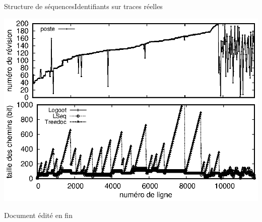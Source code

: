 \begin{frame}{Structure de séquences}{Identifiants sur traces réelles}

  \hspace{-1cm}
  \begin{minipage}{0.45\textwidth}
    \includegraphics[width=1.29\textwidth]{img/replication/poste.eps}
  \end{minipage}
  \hspace{1.2cm}
  \begin{minipage}{0.45\textwidth}
  \end{minipage}

  \begin{minipage}{0.4\textwidth}
    Document édité en fin
  \end{minipage}
  \hspace{1.6cm}
  \begin{minipage}{0.4\textwidth}
  \end{minipage}


\end{frame}


